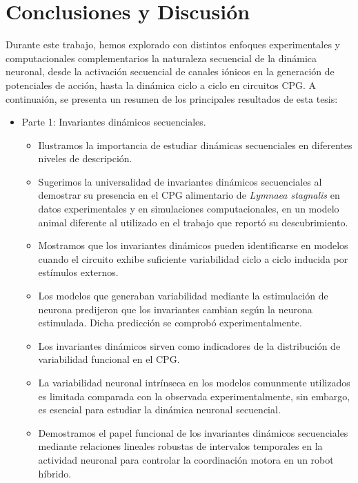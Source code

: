 \chapter{Conclusiones y Discusión} %

Durante este trabajo, hemos explorado con distintos enfoques experimentales y computacionales complementarios la naturaleza secuencial de la dinámica neuronal, desde la activación secuencial de canales iónicos en la generación de potenciales de acción, hasta la dinámica ciclo a ciclo en circuitos CPG. A continuaión, se presenta un resumen de los principales resultados de esta tesis:

\begin{itemize}
	\item Parte 1: Invariantes dinámicos secuenciales.
	\begin{itemize}
		\item Ilustramos la importancia de estudiar dinámicas secuenciales en diferentes niveles de descripción.
		\item Sugerimos la universalidad de invariantes dinámicos secuenciales al demostrar su presencia en el CPG alimentario de \textit{Lymnaea stagnalis} en datos experimentales y en simulaciones computacionales, en un modelo animal diferente al utilizado en el trabajo que reportó su descubrimiento.
		\item Mostramos que los invariantes dinámicos pueden identificarse en modelos cuando el circuito exhibe suficiente variabilidad ciclo a ciclo inducida por estímulos externos.
		\item Los modelos que generaban variabilidad mediante la estimulación de neurona predijeron que los invariantes cambian según la neurona estimulada. Dicha predicción se comprobó experimentalmente.
		\item Los invariantes dinámicos sirven como indicadores de la distribución de variabilidad funcional en el CPG.
		\item La variabilidad neuronal intrínseca en los modelos comunmente utilizados es limitada comparada con la observada experimentalmente, sin embargo, es esencial para estudiar la dinámica neuronal secuencial.
		\item Demostramos el papel funcional de los invariantes dinámicos secuenciales mediante relaciones lineales robustas de intervalos temporales en la actividad neuronal para controlar la coordinación motora en un robot híbrido.
	\end{itemize}
	

\end{itemize}
